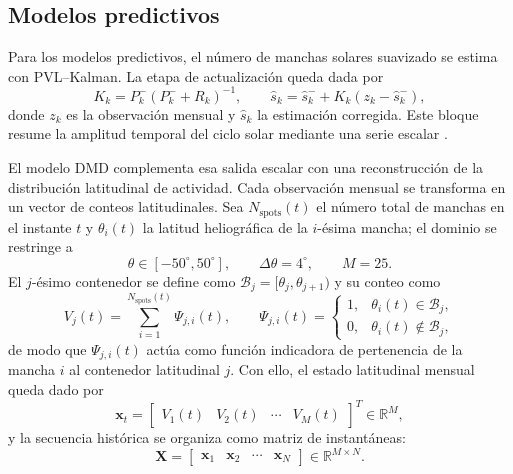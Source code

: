 \subsection{Modelos predictivos}

Para los modelos predictivos, el número de manchas solares suavizado se estima con PVL--Kalman. La etapa de actualización queda dada por
\begin{equation}
K_k=P_k^{-}(P_k^{-}+R_k)^{-1}, \qquad
\widehat{s}_k=\widehat{s}_k^{-}+K_k(z_k-\widehat{s}_k^{-}),
\end{equation}
donde $z_k$ es la observación mensual y $\widehat{s}_k$ la estimación corregida. Este bloque resume la amplitud temporal del ciclo solar mediante una serie escalar \citep{kalman1960newapproach,podladchikova2012kalman}.

El modelo DMD complementa esa salida escalar con una reconstrucción de la distribución latitudinal de actividad. Cada observación mensual se transforma en un vector de conteos latitudinales. Sea $N_{\mathrm{spots}}(t)$ el número total de manchas en el instante $t$ y $\theta_i(t)$ la latitud heliográfica de la $i$-ésima mancha; el dominio se restringe a
\begin{equation}
\theta\in[-50^{\circ},50^{\circ}], \qquad \Delta\theta=4^{\circ}, \qquad M=25.
\end{equation}
El $j$-ésimo contenedor se define como $\mathcal{B}_j=[\theta_j,\theta_{j+1})$ y su conteo como
\begin{equation}
V_j(t)=\sum_{i=1}^{N_{\mathrm{spots}}(t)}\Psi_{j,i}(t), \qquad
\Psi_{j,i}(t)=
\begin{cases}
1, & \theta_i(t)\in\mathcal{B}_j,\\
0, & \theta_i(t)\notin\mathcal{B}_j,
\end{cases}
\end{equation}
de modo que $\Psi_{j,i}(t)$ actúa como función indicadora de pertenencia de la mancha $i$ al contenedor latitudinal $j$.
Con ello, el estado latitudinal mensual queda dado por
\begin{equation}
\mathbf{x}_t=\begin{bmatrix}V_1(t)&V_2(t)&\cdots&V_M(t)\end{bmatrix}^{T}\in\mathbb{R}^{M},
\end{equation}
y la secuencia histórica se organiza como matriz de instantáneas:
\begin{equation}
\mathbf{X}=\begin{bmatrix}\mathbf{x}_1&\mathbf{x}_2&\cdots&\mathbf{x}_N\end{bmatrix}\in\mathbb{R}^{M\times N}.
\end{equation}

